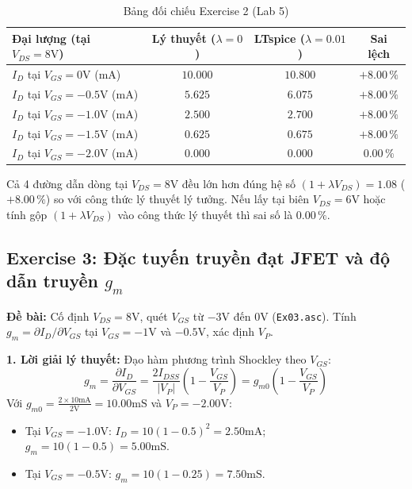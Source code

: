 \documentclass[11pt,a4paper]{article}
\newcommand{\cmd}[1]{\texttt{#1}}
\begin{document}
\begin{table}[H]\centering\small
\caption{Bảng đối chiếu Exercise 2 (Lab 5)}
\begin{tabular}{|l|c|c|c|}
\hline
\textbf{Đại lượng (tại $V_{DS}=8\text{V}$)} & \textbf{Lý thuyết ($\lambda=0$)} & \textbf{LTspice ($\lambda=0.01$)} & \textbf{Sai lệch} \\ \hline
$I_D$ tại $V_{GS}=0\text{V}$ (mA) & $10.000$ & $10.800$ & $+8.00\,\%$ \\ \hline
$I_D$ tại $V_{GS}=-0.5\text{V}$ (mA) & $5.625$ & $6.075$ & $+8.00\,\%$ \\ \hline
$I_D$ tại $V_{GS}=-1.0\text{V}$ (mA) & $2.500$ & $2.700$ & $+8.00\,\%$ \\ \hline
$I_D$ tại $V_{GS}=-1.5\text{V}$ (mA) & $0.625$ & $0.675$ & $+8.00\,\%$ \\ \hline
$I_D$ tại $V_{GS}=-2.0\text{V}$ (mA) & $0.000$ & $0.000$ & $0.00\,\%$ \\ \hline
\end{tabular}
\end{table}

\begin{notebox}
Cả 4 đường dẫn dòng tại $V_{DS}=8\text{V}$ đều lớn hơn đúng hệ số $(1+\lambda V_{DS}) = 1.08$ ($+8.00\,\%$) so với công thức lý thuyết lý tưởng. Nếu lấy tại biên $V_{DS}=6\text{V}$ hoặc tính gộp $(1+\lambda V_{DS})$ vào công thức lý thuyết thì sai số là $0.00\,\%$.
\end{notebox}

\subsection{Exercise 3: Đặc tuyến truyền đạt JFET và độ dẫn truyền \texorpdfstring{$g_m$}{gm}}
\textbf{Đề bài:} Cố định $V_{DS}=8\text{V}$, quét $V_{GS}$ từ $-3\text{V}$ đến $0\text{V}$ (\cmd{Ex03.asc}). Tính $g_m = \partial I_D / \partial V_{GS}$ tại $V_{GS}=-1\text{V}$ và $-0.5\text{V}$, xác định $V_P$.

\textbf{1. Lời giải lý thuyết:}
Đạo hàm phương trình Shockley theo $V_{GS}$:
$$g_m = \frac{\partial I_D}{\partial V_{GS}} = \frac{2I_{DSS}}{|V_P|}\left(1 - \frac{V_{GS}}{V_P}\right) = g_{m0}\left(1 - \frac{V_{GS}}{V_P}\right)$$
Với $g_{m0} = \frac{2\times 10\text{mA}}{2\text{V}} = 10.00\text{mS}$ và $V_P = -2.00\text{V}$:
\begin{itemize}[itemsep=1pt]
  \item Tại $V_{GS} = -1.0\text{V}$: $I_D = 10(1 - 0.5)^2 = 2.50\text{mA}$; $g_m = 10(1 - 0.5) = 5.00\text{mS}$.
  \item Tại $V_{GS} = -0.5\text{V}$: $g_m = 10(1 - 0.25) = 7.50\text{mS}$.
\end{itemize}
\end{document}
